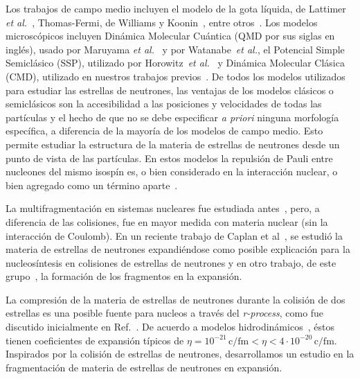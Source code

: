 Los trabajos de campo medio incluyen el modelo de la gota líquida, de Lattimer \emph{et al.}~\cite{page_minimal_2004}, Thomas-Fermi, de Williams y Koonin~\cite{williams_sub-saturation_1985}, entre otros~\cite{oyamatsu_nuclear_1993, lorenz_neutron_1993, cheng_properties_1997, watanabe_thermodynamic_2000, watanabe_electron_2003, nakazato_gyroid_2009}.
Los modelos microscópicos incluyen Dinámica Molecular Cuántica (QMD por sus siglas en inglés), usado por Maruyama \emph{et al.}~\cite{maruyama_quantum_1998, kido_md_2000} y por Watanabe~\emph{et al.}\cite{watanabe_structure_2003}, el Potencial Simple Semiclásico (SSP), utilizado por Horowitz~\emph{et al.}~\cite{horowitz_nonuniform_2004} y Dinámica Molecular Clásica (CMD), utilizado en nuestros trabajos previos~\cite{dorso_topological_2012}.
De todos los modelos utilizados para estudiar las estrellas de neutrones, las ventajas de los modelos clásicos o semiclásicos son la accesibilidad a las posiciones y velocidades de todas las partículas y el hecho de que no se debe especificar \emph{a priori} ninguna morfología específica, a diferencia de la mayoría de los modelos de campo medio.
Esto permite estudiar la estructura de la materia de estrellas de neutrones desde un punto de vista de las partículas.
En estos modelos la repulsión de Pauli entre nucleones del mismo isospín es, o bien considerado en la interacción nuclear, o bien agregado como un término aparte~\cite{dorso_classical_1988}.

La multifragmentación en sistemas nucleares fue estudiada
antes~\cite{bonasera_critical_2000, chikazumi_quantum_2001}, pero, a
diferencia de las colisiones, fue en mayor medida con materia nuclear (sin la interacción de Coulomb).
En un reciente trabajo de Caplan et al~\cite{caplan_pasta_2015}, se estudió la materia de estrellas de neutrones expandiéndose como posible explicación para la nucleosíntesis en colisiones de estrellas de neutrones y en otro trabajo, de este grupo~\cite{alcain_dynamics_2017}, la formación de los fragmentos en la expansión.

La compresión de la materia de estrellas de neutrones durante la colisión de dos estrellas es una posible fuente para nucleos a través del \emph{r-process}, como fue discutido inicialmente en Ref.~\cite{lattimer_black-hole-neutron-star_1974}.
De acuerdo a modelos hidrodinámicos~\cite{goriely_r-process_2011}, éstos tienen coeficientes de expansión típicos de  $\eta = 10^{-21}\,\text{c/fm} < \eta < 4\cdot 10^{-20}\,\text{c/fm}$.
Inspirados por la colisión de estrellas de neutrones, desarrollamos un estudio en la fragmentación de materia de estrellas de neutrones en expansión.

